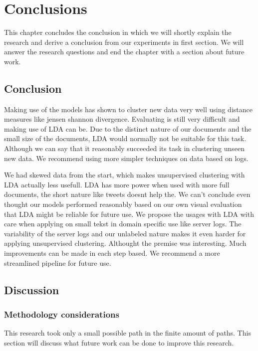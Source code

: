 \chapter{Conclusions} \label{ch:conclusions}
This chapter concludes the conclusion in which we will shortly explain the research and derive a conclusion from our experiments in first section. We will answer the research questions and end the chapter with a section about future work. 

\section{Conclusion}
Making use of the models has shown to cluster new data very well using distance measures like jensen shannon divergence. Evaluating is still very difficult and making use of LDA can be. Due to the distinct nature of our documents and the small size of the documents, LDA would normally not be suitable for this task. Although we can say that it reasonably succeeded its task in clustering unseen new data. We recommend using more simpler techniques on data based on logs. 

We had skewed data from the start, which makes unsupervised clustering with LDA actually less usefull. LDA has more power when used with more full documents, the short nature like tweets doesnt help the. We can't conclude even thought our models performed reasonably based on our own visual evaluation that LDA might be reliable for future use. We propose the usages with LDA with care when applying on small tekst in domain specific use like server logs. The variability of the server logs and our unlabeled nature makes it even harder for applying unsupervised clustering. Althought the premise was interesting. Much improvements can be made in each step based. We recommend a more streamlined pipeline for future use. 


\section{Discussion}

\subsection {Methodology considerations}
This research took only a small possible path in the finite amount of paths. This section will discuss what future work can be done to improve this research.

